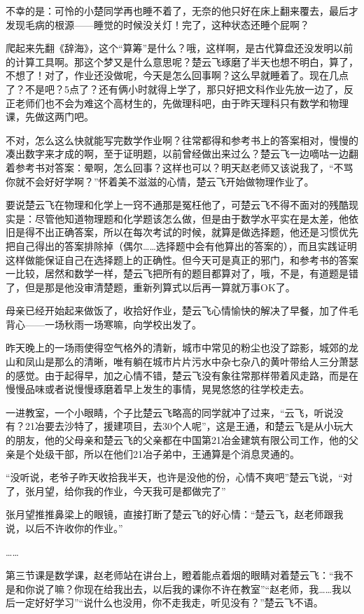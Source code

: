 不幸的是：可怜的小楚同学再也睡不着了，无奈的他只好在床上翻来覆去，最后才发现毛病的根源——睡觉的时候没关灯！完了，这种状态还睡个屁啊？

爬起来先翻《辞海》，这个“算筹”是什么？哦，这样啊，是古代算盘还没发明以前的计算工具啊。那这个梦又是什么意思呢？楚云飞琢磨了半天也想不明白，算了，不想了！对了，作业还没做呢，今天是怎么回事啊？这么早就睡着了。现在几点了？不是吧？5点了？还有俩小时就得上学了，那只好把文科作业先放一边了，反正老师们也不会为难这个高材生的，先做理科吧，由于昨天理科只有数学和物理课，先做这两门吧。

不对，怎么这么快就能写完数学作业啊？往常都得和参考书上的答案相对，慢慢的凑出数字来才成的啊，至于证明题，以前曾经做出来过么？楚云飞一边嘀咕一边翻着参考书对答案：晕啊，怎么回事？这样也可以？明天赵老师又该说我了，“不骂你就不会好好学啊？”怀着美不滋滋的心情，楚云飞开始做物理作业了。

要说楚云飞在物理和化学上一窍不通那是冤枉他了，可楚云飞不得不面对的残酷现实是：尽管他知道物理题和化学题该怎么做，但是由于数学水平实在是太差，他依旧是得不出正确答案，所以在每次考试的时候，就算是做选择题，他还是习惯优先把自己得出的答案排除掉（偶尔……选择题中会有他算出的答案的），而且实践证明这样做能保证自己在选择题上的正确性。但今天可是真正的邪门，和参考书的答案一比较，居然和数学一样，楚云飞把所有的题目都算对了，哦，不是，有道题是错了，但是那是他没审清楚题，重新列算式以后再一算就万事OK了。

母亲已经开始起来做饭了，收拾好作业，楚云飞心情愉快的解决了早餐，加了件毛背心——一场秋雨一场寒嘛，向学校出发了。

昨天晚上的一场雨使得空气格外的清新，城市中常见的粉尘也没了踪影，城郊的龙山和凤山是那么的清晰，唯有躺在城市片片污水中杂七杂八的黄叶带给人三分萧瑟的感觉。由于起得早，加之心情不错，楚云飞没有象往常那样带着风走路，而是在慢慢品味或者说慢慢琢磨着早上发生的事情，晃晃悠悠的往学校走去。

一进教室，一个小眼睛，个子比楚云飞略高的同学就冲了过来，“云飞，听说没有？21冶要去沙特了，援建项目，去30个人呢”，这是王通，和楚云飞是从小玩大的朋友，他的父母亲和楚云飞的父亲都在中国第21冶金建筑有限公司工作，他的父亲是个处级干部，所以在他们21冶子弟中，王通算是个消息灵通的。

“没听说，老爷子昨天收拾我半天，也许是没他的份，心情不爽吧”楚云飞说，“对了，张月望，给你我的作业，今天我可是都做完了”

张月望推推鼻梁上的眼镜，直接打断了楚云飞的好心情：“楚云飞，赵老师跟我说，以后不许收你的作业。”

……

第三节课是数学课，赵老师站在讲台上，瞪着能点着烟的眼睛对着楚云飞：“我不是和你说了嘛？你现在给我出去，以后我的课你不许在教室”“赵老师，我……我以后一定好好学习”“说什么也没用，你不走我走，听见没有？”楚云飞不语。

